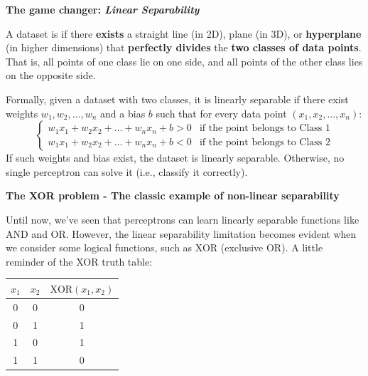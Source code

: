 \highspace
\begin{flushleft}
    \textcolor{Green3}{ \textbf{The game changer: \emph{Linear Separability}}}
\end{flushleft}
\begin{definitionbox}
    A dataset is  if there \textbf{exists} a straight line (in 2D), plane (in 3D), or \textbf{hyperplane} (in higher dimensions) that \textbf{perfectly divides} the \textbf{two classes of data points}. That is, all points of one class lie on one side, and all points of the other class lies on the opposite side.

    \highspace
    Formally, given a dataset with two classes, it is linearly separable if there exist weights $ w_1, w_2, \ldots, w_n $ and a bias $ b $ such that for every data point $ (x_1, x_2, \ldots, x_n) $:
    \begin{equation*}
        \begin{cases}
            w_1 x_1 + w_2 x_2 + \ldots + w_n x_n + b > 0 & \text{if the point belongs to Class 1} \\
            w_1 x_1 + w_2 x_2 + \ldots + w_n x_n + b < 0 & \text{if the point belongs to Class 2}
        \end{cases}
    \end{equation*}
    If such weights and bias exist, the dataset is linearly separable. Otherwise, no single perceptron can solve it (i.e., classify it correctly).
\end{definitionbox}

\newpage

\begin{flushleft}
    \textcolor{Red2}{ \textbf{The XOR problem - The classic example of non-linear separability}}
\end{flushleft}
Until now, we've seen that perceptrons can learn linearly separable functions like AND and OR. However, the linear separability limitation becomes evident when we consider some logical functions, such as XOR (exclusive OR). A little reminder of the XOR truth table:
\begin{table}[!htp]
    \centering
    \begin{tabular}{@{} c c c @{}}
        \toprule
        $ x_1 $ & $ x_2 $ & $ \text{XOR}(x_1, x_2) $ \\
        \midrule
        0 & 0 & 0 \\
        0 & 1 & 1 \\
        1 & 0 & 1 \\
        1 & 1 & 0 \\
        \bottomrule
    \end{tabular}
\end{table}

